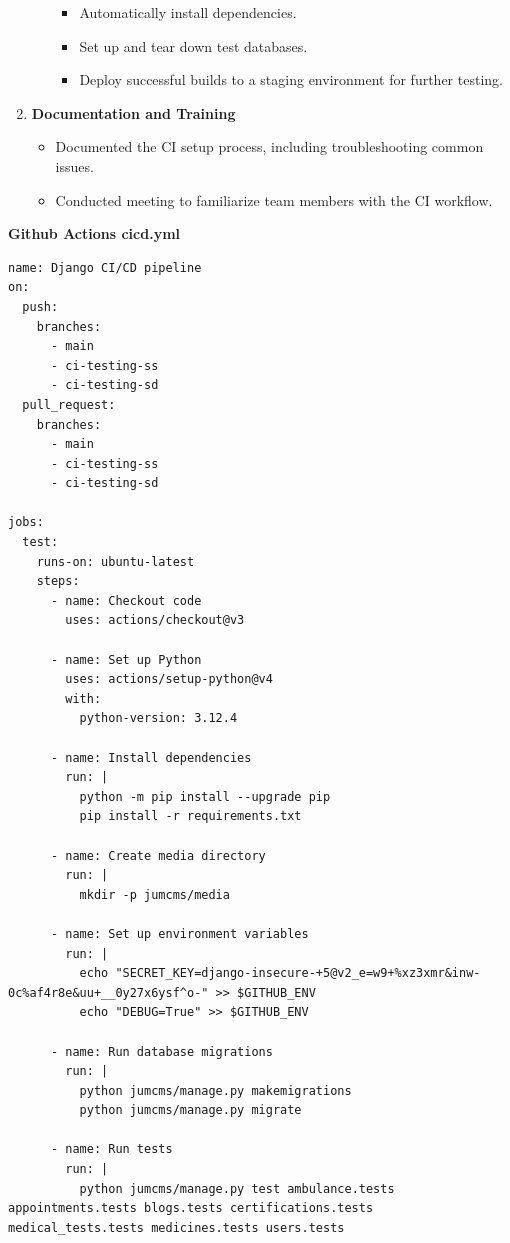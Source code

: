 \documentclass[a4paper,12pt]{article}
\begin{document}
\begin{enumerate}
\begin{itemize}
\begin{itemize}
                \item Automatically install dependencies.
                \item Set up and tear down test databases.
                \item Deploy successful builds to a staging environment for further testing.
\end{itemize}
\end{itemize}
\item \textbf{Documentation and Training}
    \begin{itemize}
        \item Documented the CI setup process, including troubleshooting common issues.
        \item Conducted meeting to familiarize team members with the CI workflow.
\end{itemize}
\end{enumerate}
\textbf{Github Actions cicd.yml}
\begin{tcolorbox}[colback=base3, colframe=base2, sharp corners=all]
\begin{lstlisting}
name: Django CI/CD pipeline
on:
  push:
    branches:
      - main
      - ci-testing-ss
      - ci-testing-sd
  pull_request:
    branches:
      - main
      - ci-testing-ss
      - ci-testing-sd

jobs:
  test:
    runs-on: ubuntu-latest
    steps:
      - name: Checkout code
        uses: actions/checkout@v3

      - name: Set up Python
        uses: actions/setup-python@v4
        with:
          python-version: 3.12.4

      - name: Install dependencies
        run: |
          python -m pip install --upgrade pip
          pip install -r requirements.txt

      - name: Create media directory
        run: |
          mkdir -p jumcms/media

      - name: Set up environment variables
        run: |
          echo "SECRET_KEY=django-insecure-+5@v2_e=w9+%xz3xmr&inw-0c%af4r8e&uu+__0y27x6ysf^o-" >> $GITHUB_ENV
          echo "DEBUG=True" >> $GITHUB_ENV

      - name: Run database migrations
        run: |
          python jumcms/manage.py makemigrations
          python jumcms/manage.py migrate

      - name: Run tests
        run: |
          python jumcms/manage.py test ambulance.tests appointments.tests blogs.tests certifications.tests medical_tests.tests medicines.tests users.tests
\end{lstlisting}
\end{tcolorbox}
\end{document}
